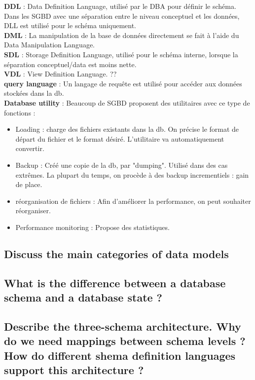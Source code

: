\textbf{DDL} :
Data Definition Language, utilisé par le DBA pour définir le schéma.
Dans les SGBD avec une séparation entre le niveau conceptuel et les données, 
DLL est utilisé pour le schéma uniquement. \\
\textbf{DML} : 
La manipulation de la base de données directement se fait à l'aide du 
Data Manipulation Language.\\
\textbf{SDL} : Storage Definition Language, utilisé pour le schéma interne, lorsque la séparation conceptuel/data est moins nette.\\
\textbf{VDL} : View Definition Language. ?? \\
\textbf{query language} : Un langage de requête est utilisé pour accéder aux données stockées dans la db. \\
\textbf{Database utility} : 
Beaucoup de SGBD proposent des utilitaires avec ce type de fonctions :
\begin{itemize}
	\item Loading : charge des fichiers existants dans la db. On précise le 
	format de départ du fichier et le format désiré. L'utilitaire 
	va automatiquement convertir. 
	 \item Backup : Créé une copie de la db, par "dumping". Utilisé dans des 
	 cas extrêmes. La plupart du temps, on procède à des backup incrementiels : gain de place.
	 \item réorganisation de fichiers : Afin d'améliorer la performance, on peut souhaiter réorganiser.
	 \item Performance monitoring : Propose des statistiques.
\end{itemize}

\subsection{Discuss the main categories of data models}

\subsection{What is the difference between a database schema and a database state ?}

\subsection{Describe the three-schema architecture. Why do we need mappings between schema levels ? How do different shema definition languages support this architecture ?}

